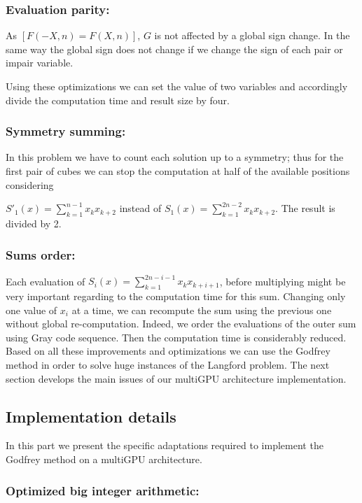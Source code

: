 \subsubsection{Evaluation parity: }
As $[F(-X,n) = F(X,n)]$, $G$ is not affected by a global sign change. 
In the same way the global sign does not change if we change the sign of each pair or impair variable.

Using these optimizations we can set the value of two variables and accordingly divide the computation time and result size by four.

\subsubsection{Symmetry summing: }
In this problem we have to count each solution up to a symmetry; thus for the first pair of cubes we can stop the computation at half of the available positions considering 

\noindent $S'_1(x) = \sum_{k=1}^{n-1}x_kx_{k+2}$ instead of $S_1(x) = \sum_{k=1}^{2n-2} x_kx_{k+2}$.
The result is divided by 2. 

\subsubsection{Sums order: }
Each evaluation of $ S_i(x) = \sum_{k=1}^{2n-i-1} x_kx_{k+i+1} $, before multiplying might be very important regarding to the computation time for this sum. 
Changing only one value of $ x_i $ at a time, we can recompute the sum using the previous one without global re-computation. 
Indeed, we order the evaluations of the outer sum using Gray code sequence. 
Then the computation time is considerably reduced. \\

Based on all these improvements and optimizations we can use the Godfrey method in order to solve huge instances of the Langford problem. 
The next section develops the main issues of our multiGPU architecture implementation. 

\subsection{Implementation details}
In this part we present the specific adaptations required to implement the Godfrey method on a multiGPU architecture.

\subsubsection{Optimized big integer arithmetic: }

